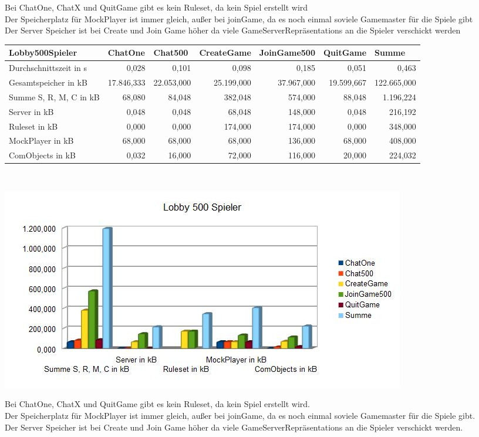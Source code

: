 \documentclass[a4paper]{article}
\begin{document}
Bei ChatOne, ChatX und QuitGame gibt es kein Ruleset, da kein Spiel erstellt wird \\
Der Speicherplatz für MockPlayer ist immer gleich, außer bei joinGame, da es noch einmal soviele Gamemaster für die Spiele gibt \\
Der Server Speicher ist bei Create und Join Game höher da viele GameServerRepräsentations an die Spieler verschickt werden \\

\noindent
\begin{tabular}{|l|r|r|r|r|r|r|}
\hline
Lobby500Spieler & \multicolumn{1}{l|}{ChatOne} & \multicolumn{1}{l|}{Chat500} & \multicolumn{1}{l|}{CreateGame} & \multicolumn{1}{l|}{JoinGame500} & \multicolumn{1}{l|}{QuitGame} & \multicolumn{1}{l|}{Summe} \\ \hline
Durchschnittszeit in s & 0,028 & 0,101 & 0,098 & 0,185 & 0,051 & 0,463 \\ \hline
Gesamtspeicher in kB & 17.846,333 & 22.053,000 & 25.199,000 & 37.967,000 & 19.599,667 & 122.665,000 \\ \hline
Summe S, R, M, C in kB & 68,080 & 84,048 & 382,048 & 574,000 & 88,048 & 1.196,224 \\ \hline
Server in kB & 0,048 & 0,048 & 68,048 & 148,000 & 0,048 & 216,192 \\ \hline
Ruleset in kB & 0,000 & 0,000 & 174,000 & 174,000 & 0,000 & 348,000 \\ \hline
MockPlayer in kB & 68,000 & 68,000 & 68,000 & 136,000 & 68,000 & 408,000 \\ \hline
ComObjects in kB & 0,032 & 16,000 & 72,000 & 116,000 & 20,000 & 224,032 \\ \hline
\end{tabular}
\ \\
\begin{center}
\includegraphics[scale=0.75]{1}
\end{center}
Bei ChatOne, ChatX und QuitGame gibt es kein Ruleset, da kein Spiel erstellt wird. \\
Der Speicherplatz für MockPlayer ist immer gleich, außer bei joinGame, da es noch einmal soviele Gamemaster für die Spiele gibt. \\
Der Server Speicher ist bei Create und Join Game höher da viele GameServerRepräsentations an die Spieler verschickt werden. \\
\ \\
\ \\
\end{document}
